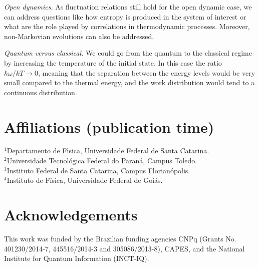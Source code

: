 \documentclass[a0,portrait]{a0poster}
\begin{document}
\begin{multicols}{2}
{\em Open dynamics.} As fluctuation relations still hold for the open dynamic case, we can address questions like how entropy is produced in the system of interest or what are the role played by correlations in thermodynamic processes. Moreover, non-Markovian evolutions can also be addressed.

{\em Quantum versus classical.} We could go from the quantum to the classical regime by increasing the temperature of the initial state. In this case the ratio $\hbar\omega/kT \rightarrow 0$, meaning that the separation between the energy levels would be very small compared to the thermal energy, and the work distribution would tend to a continuous distribution.


\section*{Affiliations (publication time)}
$^{1}$Departamento de F\' \i sica, Universidade Federal de Santa Catarina. \\
$^{2}$Universidade Tecnol\'ogica Federal do Paran\'a, Campus Toledo. \\
$^{3}$Instituto Federal de Santa Catarina, Campus Florian\'opolis. \\
$^{4}$Instituto de F\'{i}sica, Universidade Federal de Goi\'{a}s.

\section*{Acknowledgements}
This work was funded by the Brazilian funding agencies CNPq (Grants No. 401230/2014-7, 445516/2014-3 and 305086/2013-8), CAPES, and the National Institute for Quantum Information (INCT-IQ).

\end{multicols}
\end{document}
